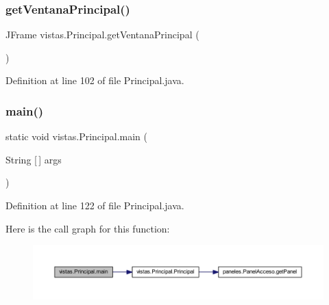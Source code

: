 \mbox{\label{classvistas_1_1_principal_afc2c81827c88c9c2494b3345264e747d}} 
\subsubsection{\texorpdfstring{get\+Ventana\+Principal()}{getVentanaPrincipal()}}
{\footnotesize\ttfamily J\+Frame vistas.\+Principal.\+get\+Ventana\+Principal (\begin{DoxyParamCaption}{ }\end{DoxyParamCaption})}



Definition at line 102 of file Principal.\+java.

\mbox{\label{classvistas_1_1_principal_a626dbf26bfdd3a03a2c1c99e34d25b6c}} 
\subsubsection{\texorpdfstring{main()}{main()}}
{\footnotesize\ttfamily static void vistas.\+Principal.\+main (\begin{DoxyParamCaption}\item[{String \mbox{[}$\,$\mbox{]}}]{args }\end{DoxyParamCaption})\hspace{0.3cm}{\ttfamily [static]}}



Definition at line 122 of file Principal.\+java.

Here is the call graph for this function\+:
\nopagebreak
\begin{figure}[H]
\begin{center}
\leavevmode
\includegraphics[width=350pt]{classvistas_1_1_principal_a626dbf26bfdd3a03a2c1c99e34d25b6c_cgraph}
\end{center}
\end{figure}
\mbox{\label{classvistas_1_1_principal_a6f45e56ee7c99715b798ff202bd57d7e}} 
